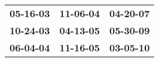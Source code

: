 \begin{supertabular}{p{0.33\columnwidth}p{0.33\columnwidth}p{0.33\columnwidth}}
 \textbf{05-16-03\textsuperscript{}} &  \textbf{11-06-04\textsuperscript{}} &  \textbf{04-20-07\textsuperscript{}} \\
 \textbf{10-24-03\textsuperscript{}} &  \textbf{04-13-05\textsuperscript{}} &  \textbf{05-30-09\textsuperscript{}} \\
 \textbf{06-04-04\textsuperscript{}} &  \textbf{11-16-05\textsuperscript{}} &  \textbf{03-05-10\textsuperscript{}} \\
\end{supertabular}
